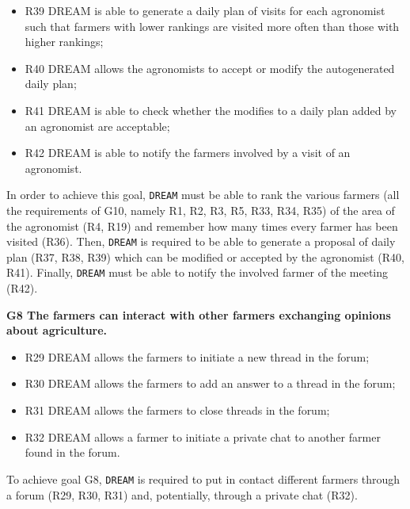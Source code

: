 \documentclass{article}
\begin{document}
\begin{itemize}
\item R39 DREAM is able to generate a daily plan of visits for each agronomist such that farmers with lower rankings are visited more often than those with higher rankings;

\item R40 DREAM allows the agronomists to accept or modify the autogenerated daily plan;

\item R41 DREAM is able to check whether the modifies to a daily plan added by an agronomist are acceptable;

\item R42 DREAM is able to notify the farmers involved by a visit of an agronomist.
\end{itemize}
In order to achieve this goal, \verb|DREAM| must be able to rank the various farmers (all the requirements of G10, namely R1, R2, R3, R5, R33, R34, R35) of the area of the agronomist (R4, R19) and remember how many times every farmer has been visited (R36). Then, \verb|DREAM| is required to be able to generate a proposal of daily plan (R37, R38, R39) which can be modified or accepted by the agronomist (R40, R41). Finally, \verb|DREAM| must be able to notify the involved farmer of the meeting (R42).

\vspace{5mm}
\textbf{G8 The farmers can interact with other farmers exchanging opinions about agriculture.}
\begin{itemize}
    \item R29 DREAM allows the farmers to initiate a new thread in the forum;

    \item R30 DREAM allows the farmers to add an answer to a thread in the forum;

    \item R31 DREAM allows the farmers to close threads in the forum;

    \item R32 DREAM allows a farmer to initiate a private chat to another farmer found in the forum.
\end{itemize}
To achieve goal G8, \verb|DREAM| is required to put in contact different farmers through a forum (R29, R30, R31) and, potentially, through a private chat (R32).
\end{document}
